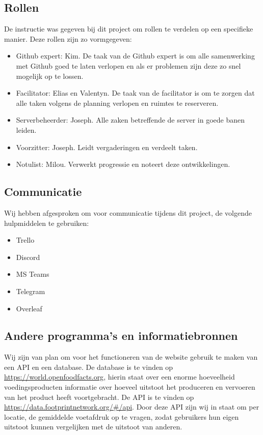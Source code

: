 \documentclass{uva-inf-article}
\begin{document}
\subsection{Rollen} 
De instructie was gegeven bij dit project om rollen te verdelen op een specifieke manier. Deze rollen zijn zo vormgegeven: 
\begin{itemize}
    \item Github expert: Kim. De taak van de Github expert is om alle samenwerking met Github goed te laten verlopen en als er problemen zijn deze zo snel mogelijk op te lossen.
    \item Facilitator: Elias en Valentyn. De taak van de facilitator is om te zorgen dat alle taken volgens de planning verlopen en ruimtes te reserveren.
    \item Serverbeheerder: Joseph. Alle zaken betreffende de server in goede banen leiden.
    \item Voorzitter: Joseph. Leidt vergaderingen en verdeelt taken.
    \item Notulist: Milou. Verwerkt progressie en noteert deze ontwikkelingen. 
\end{itemize}

\subsection{Communicatie}
Wij hebben afgesproken om voor communicatie tijdens dit project, de volgende hulpmiddelen te gebruiken:
\begin{itemize}
    \item Trello
    \item Discord
    \item MS Teams
    \item Telegram
    \item Overleaf
\end{itemize}

\subsection{Andere programma's en informatiebronnen}
Wij zijn van plan om voor het functioneren van de website gebruik te maken van een API en een database. De database is te vinden op  \url{https://world.openfoodfacts.org}, hierin staat over een enorme hoeveelheid voedingsproducten informatie over hoeveel uitstoot het produceren en vervoeren van het product heeft voortgebracht.
De API is te vinden op \url{https://data.footprintnetwork.org/\#/api}.
Door deze API zijn wij in staat om per locatie, de gemiddelde voetafdruk op te vragen, zodat gebruikers hun eigen uitstoot kunnen vergelijken met de uitstoot van anderen.
\end{document}
